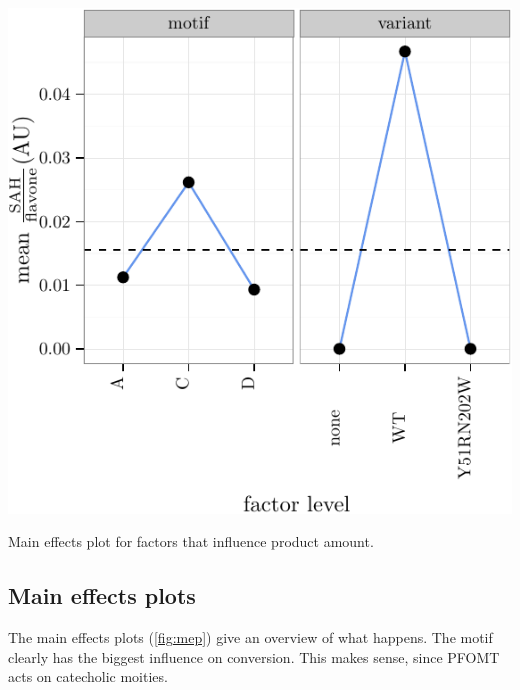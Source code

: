 \documentclass[]{tufte-handout}
\begin{document}
\begin{marginfigure}
 \includegraphics{tufte_files/figure-latex/unnamed-chunk-5-1.pdf}
\caption{Main effects plot for factors that influence product amount.}
\end{marginfigure}

\subsection{Main effects plots}\label{main-effects-plots}

The main effects plots (\ref{fig:mep}) give an overview of what happens.
The motif clearly has the biggest influence on conversion. This makes
sense, since PFOMT acts on catecholic moities.
\end{document}
